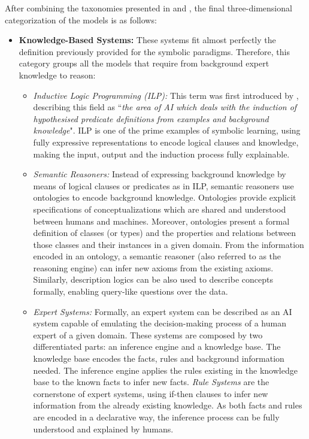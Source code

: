 After combining the taxonomies presented in \cite{hopgood_2009_knowledge-based} and \cite{corea_ai_2019}, the final three-dimensional categorization of the models is as follows:
\begin{itemize}
    \item \textbf{Knowledge-Based Systems:} These systems fit almost perfectly the definition previously provided for the symbolic paradigms. Therefore, this category groups all the models that require from background expert knowledge to reason:
    \begin{itemize}
        \item \textit{Inductive Logic Programming (ILP):} This term was first introduced by \cite{Muggleton1991}, describing this field as ``\textit{the area of AI which deals with the induction of hypothesised predicate definitions from examples and background knowledge}". ILP is one of the prime examples of symbolic learning, using fully expressive representations to encode logical clauses and knowledge, making the input, output and the induction process fully explainable.
        \item \textit{Semantic Reasoners:} Instead of expressing background knowledge by means of logical clauses or predicates as in ILP, semantic reasoners use ontologies to encode background knowledge. Ontologies \citep{noy2001ontology} provide explicit specifications of conceptualizations which are shared and understood between humans and machines. Moreover, ontologies present a formal definition of classes (or types) and the properties and relations between those classes and their instances in a given domain. From the information encoded in an ontology, a semantic reasoner (also referred to as the reasoning engine) can infer new axioms from the existing axioms. Similarly, description logics \citep{description_logics} can be also used to describe concepts formally, enabling query-like questions over the data.
  
        \item \textit{Expert Systems:} Formally, an expert system can be described as an AI system capable of emulating the decision-making process of a human expert of a given domain. These systems are composed by two differentiated parts: an inference engine and a knowledge base. The knowledge base encodes the facts, rules and background information needed. The inference engine applies the rules existing in the knowledge base to the known facts to infer new facts. \textit{Rule Systems} are the cornerstone of expert systems, using if-then clauses to infer new information from the already existing knowledge. As both facts and rules are encoded in a declarative way, the inference process can be fully understood and explained by humans. 
        

\end{itemize}
\end{itemize}
